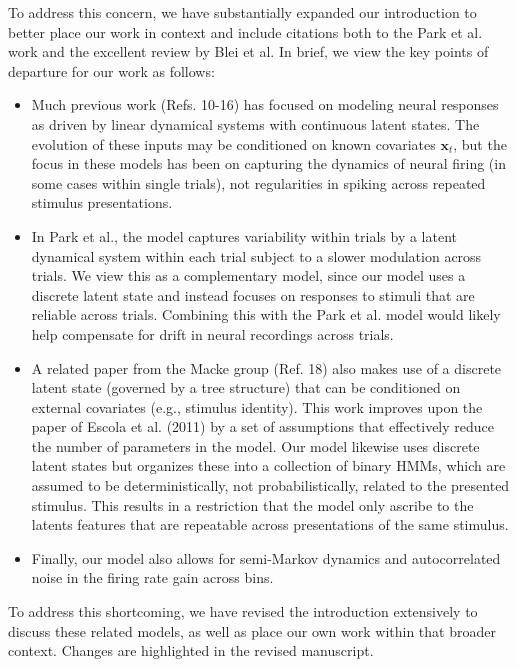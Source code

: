 \documentclass[12pt,a4paper]{article}
\newcommand{\edit}[1]{\textcolor{edit}{#1}}
\begin{document}
\edit{
To address this concern, we have substantially expanded our introduction to better place our work in context and include citations both to the Park et al. work and the excellent review by Blei et al. In brief, we view the key points of departure for our work as follows:
\begin{itemize}
    \item Much previous work (Refs. 10-16) has focused on modeling neural responses as driven by linear dynamical systems with continuous latent states. The evolution of these inputs may be conditioned on known covariates $\mathbf{x}_t$, but the focus in these models has been on capturing the dynamics of neural firing (in some cases within single trials), not regularities in spiking across repeated stimulus presentations.
    \item In Park et al., the model captures variability within trials by a latent dynamical system within each trial subject to a slower modulation across trials. We view this as a complementary model, since our model uses a discrete latent state and instead focuses on responses to stimuli that are reliable across trials. Combining this with the Park et al. model would likely help compensate for drift in neural recordings across trials.
    \item A related paper from the Macke group (Ref. 18) also makes use of a discrete latent state (governed by a tree structure) that can be conditioned on external covariates (e.g., stimulus identity). This work improves upon the paper of Escola et al. (2011) by a set of assumptions that effectively reduce the number of parameters in the model. Our model likewise uses discrete latent states but organizes these into a collection of binary HMMs, which are assumed to be deterministically, not probabilistically, related to the presented stimulus. This results in a restriction that the model only ascribe to the latents features that are repeatable across presentations of the same stimulus.
    \item Finally, our model also allows for semi-Markov dynamics and autocorrelated noise in the firing rate gain across bins.
\end{itemize}
}

\edit{
To address this shortcoming, we have revised the introduction extensively to discuss these related models, as well as place our own work within that broader context. Changes are highlighted in the revised manuscript.
}
\end{document}
